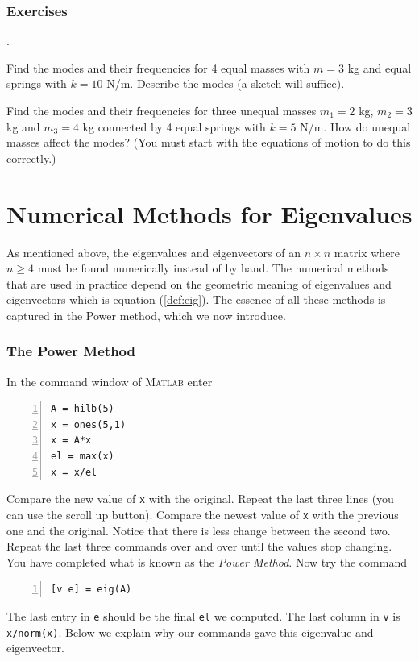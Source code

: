 
\subsection*{Exercises}
\begin{list}
{.}{}

\item Find the modes and their frequencies for 4 equal masses with $m=3$ kg and equal springs with $k=10$ N/m.
Describe the modes (a sketch will suffice).
\item
Find the modes and their frequencies for  three unequal masses $m_1 = 2$ kg, $m_2 = 3$ kg and $m_3 = 4$ kg
connected by 4 equal springs with $k = 5$ N/m.
How do unequal masses affect the modes? (You must start with the equations of motion to
do this correctly.)

\end{list}



\chapter{Numerical Methods for Eigenvalues}
\label{EWmeth}

As mentioned above, the eigenvalues and eigenvectors of an $n \times n$ matrix
where $n \ge 4$ must be found numerically instead of by hand.
The numerical methods that are used in practice depend on
the geometric meaning of eigenvalues and eigenvectors which is equation
(\ref{def:eig}). The essence of all these methods is captured
in the Power method, which we now introduce.


\subsection*{The Power Method}


In the command window of \textsc{Matlab} enter
\begin{lstlisting}[frame=none,numbers=left]
A = hilb(5)
x = ones(5,1)
x = A*x
el = max(x)
x = x/el
\end{lstlisting}

Compare the new value of \verb&x& with the original.
Repeat the last three lines (you can use the scroll up button).
Compare the newest value of \verb&x& with the previous one and
the original. Notice that there is less change between the second two.
Repeat the last three commands over and over until the values
stop changing. You have completed what is known as the {\em Power Method}.
Now try the command
\begin{lstlisting}[frame=none,numbers=left]
[v e] = eig(A)
\end{lstlisting}
The last entry in \verb&e& should be the final \verb&el& we
computed. The last column in \verb&v& is \verb&x/norm(x)&.
Below we explain why our commands gave this eigenvalue and eigenvector.


